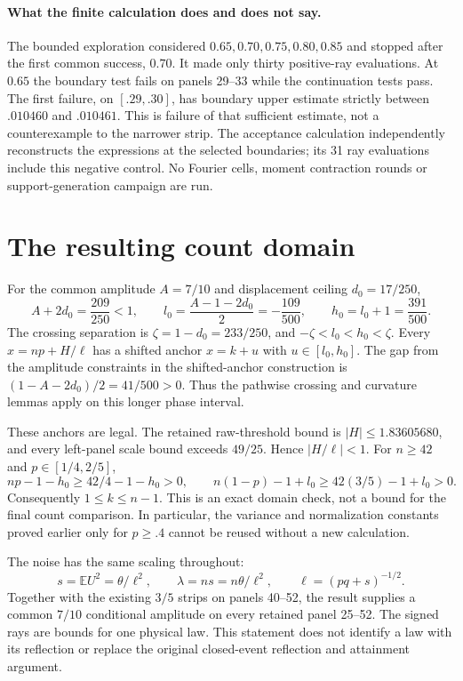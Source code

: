 \paragraph{What the finite calculation does and does not say.}
The bounded exploration considered $0.65,0.70,0.75,0.80,0.85$ and stopped
after the first common success, $0.70$. It made only thirty positive-ray
evaluations. At $0.65$ the boundary test fails on panels 29--33 while the
continuation tests pass. The first failure, on $[.29,.30]$, has boundary
upper estimate strictly between $.010460$ and $.010461$. This is failure
of that sufficient estimate, not a counterexample to the narrower strip.
The acceptance calculation independently reconstructs the expressions at
the selected boundaries; its 31 ray evaluations include this negative
control. No Fourier cells, moment contraction rounds or support-generation
campaign are run.

\section{The resulting count domain}

For the common amplitude $A=7/10$ and displacement ceiling $d_0=17/250$,
\[
 A+2d_0=\frac{209}{250}<1,\qquad
 l_0=\frac{A-1-2d_0}{2}=-\frac{109}{500},\qquad
 h_0=l_0+1=\frac{391}{500}.
\]
The crossing separation is $\zeta=1-d_0=233/250$, and
$-\zeta<l_0<h_0<\zeta$. Every $x=np+H/\ell$ has a shifted anchor
$x=k+u$ with $u\in[l_0,h_0]$. The gap from the amplitude constraints
in the shifted-anchor construction is $(1-A-2d_0)/2=41/500>0$.
Thus the pathwise crossing and curvature lemmas apply on this longer
phase interval.

These anchors are legal. The retained raw-threshold bound is
$|H|\le1.83605680$, and every left-panel scale bound exceeds $49/25$.
Hence $|H/\ell|<1$. For $n\ge42$ and $p\in[1/4,2/5]$,
\[
 np-1-h_0\ge42/4-1-h_0>0,
 \qquad n(1-p)-1+l_0\ge42(3/5)-1+l_0>0.
\]
Consequently $1\le k\le n-1$. This is an exact domain check, not a
bound for the final count comparison. In particular, the variance and
normalization constants proved earlier only for $p\ge.4$ cannot be
reused without a new calculation.

The noise has the same scaling throughout:
\[
 s=\mathbb E U^2=\theta/\ell^2,\qquad
 \lambda=ns=n\theta/\ell^2,\qquad \ell=(pq+s)^{-1/2}.
\]
Together with the existing $3/5$ strips on panels 40--52, the result
supplies a common $7/10$ conditional amplitude on every retained panel
25--52. The signed rays are bounds for one physical law. This statement
does not identify a law with its reflection or replace the original
closed-event reflection and attainment argument.

